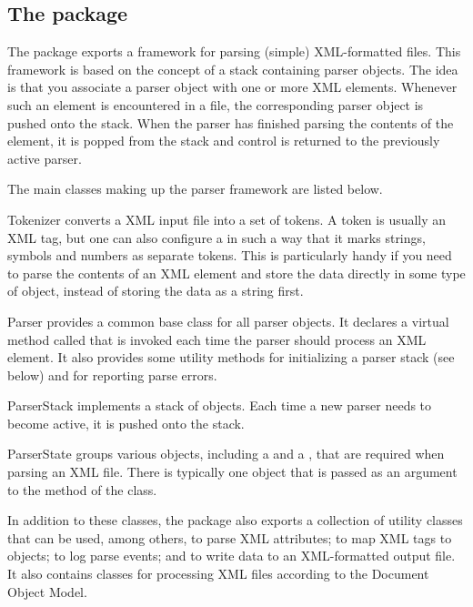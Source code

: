 \documentclass[a4paper,10pt]{article}
\begin{document}
\subsection{The  package}

The  package exports a framework for parsing (simple)
XML-formatted files. This framework is based on the concept of a stack
containing parser objects. The idea is that you associate a parser object
with one or more XML elements. Whenever such an element is encountered in
a file, the corresponding parser object is pushed onto the stack. When
the parser has finished parsing the contents of the element, it is popped
from the stack and control is returned to the previously active
parser.

The main classes making up the parser framework are listed below.
\begin{Description}[\Code]

\item[Tokenizer] converts a XML input file into a set of tokens. A token
  is usually an XML tag, but one can also configure a  in
  such a way that it marks strings, symbols and numbers as separate
  tokens. This is particularly handy if you need to parse the contents of
  an XML element and store the data directly in some type of object,
  instead of storing the data as a string first.

\item[Parser] provides a common base class for all parser objects. It
  declares a virtual method called  that is invoked each time
  the parser should process an XML element. It also provides some utility
  methods for initializing a parser stack (see below) and for reporting
  parse errors.

\item[ParserStack] implements a stack of  objects. Each time
  a new parser needs to become active, it is pushed onto the stack.

\item[ParserState] groups various objects, including a 
  and a , that are required when parsing an XML
  file. There is typically one  object that is
  passed as an argument to the  method of the 
  class.

\end{Description}
In addition to these classes, the  package also exports a
collection of utility classes that can be used, among others, to parse
XML attributes; to map XML tags to  objects; to log parse
events; and to write data to an XML-formatted output file. It also
contains classes for processing XML files according to the Document
Object Model.
\end{document}
